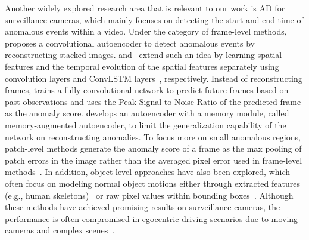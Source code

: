 Another widely explored research area that is relevant to our work is AD for surveillance cameras, which mainly focuses on detecting the start and end time of anomalous events within a video. Under the category of frame-level methods, \cite{hasan2016learning} proposes a convolutional autoencoder to detect anomalous events by reconstructing stacked images. \cite{chong2017abnormal} and~\cite{luo2017remembering} extend such an idea by learning spatial features and the temporal evolution of the spatial features separately using convolution layers and ConvLSTM layers~\citep{shi2015convolutional}, respectively. Instead of reconstructing frames, \cite{liu2018future} trains a fully convolutional network to predict future frames based on past observations and uses the Peak Signal to Noise Ratio of the predicted frame as the anomaly score. \cite{gong2019memorizing} develops an autoencoder with a memory module, called memory-augmented autoencoder, to limit the generalization capability of the network on reconstructing anomalies. To focus more on small anomalous regions, patch-level methods generate the anomaly score of a frame as the max pooling of patch errors in the image rather than the averaged pixel error used in frame-level methods~\citep{wang2023memory}. In addition, object-level approaches have also been explored, which often focus on modeling normal object motions either through extracted features (e.g., human skeletons)~\citep{morais2019learning} or raw pixel values within bounding boxes~\citep{liu2021hybrid}. Although these methods have achieved promising results on surveillance cameras, the performance is often compromised in egocentric driving scenarios due to moving cameras and complex scenes~\citep{yao2022dota}.

